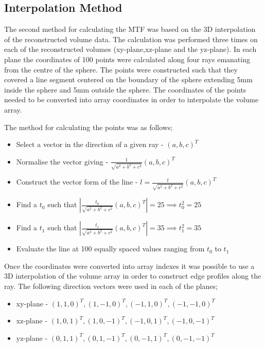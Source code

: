 \documentclass[
  twoside,
  11pt, a4paper,
  footinclude=true,
  headinclude=true,
  cleardoublepage=empty
]{scrbook}
\begin{document}
\subsection{Interpolation Method}

The second method for calculating the MTF was based on the 3D interpolation of the reconstructed volume data. The calculation was performed three times on each of the reconstructed volumes (xy-plane,xz-plane and the yz-plane). In each plane the coordinates of 100 points were calculated along four rays emanating from the centre of the sphere. The points were constructed such that they covered a line segment centered on the boundary of the sphere extending 5mm inside the sphere and 5mm outside the sphere. The coordinates of the points needed to be converted into array coordinates in order to interpolate the volume array.

The method for calculating the points was as follows;

\begin{itemize}
\item Select a vector in the direction of a given ray - $(a,b,c)^T$
\item Normalise the vector giving - $\frac{1}{\sqrt{a^2+b^2+c^2}}(a,b,c)^T$
\item Construct the vector form of the line - $l = \frac{t}{\sqrt{a^2+b^2+c^2}}(a,b,c)^T$
\item Find a $t_0$ such that $|\frac{t_0}{\sqrt{a^2+b^2+c^2}}(a,b,c)^T| = 25 \implies t_0^2 = 25$
\item Find a $t_1$ such that $|\frac{t_1}{\sqrt{a^2+b^2+c^2}}(a,b,c)^T| = 35 \implies t_1^2 = 35$
\item Evaluate the line at 100 equally spaced values ranging from $t_0$ to $t_1$
\end{itemize}

Once the coordinates were converted into array indexes it was possible to use a 3D interpolation of the volume array in order to construct edge profiles along the ray. The following direction vectors were used in each of the planes;

\begin{itemize}
\item xy-plane - ${(1,1,0)^T,(1,-1,0)^T,(-1,1,0)^T,(-1,-1,0)^T}$
\item xz-plane - ${(1,0,1)^T,(1,0,-1)^T,(-1,0,1)^T,(-1,0,-1)^T}$
\item yz-plane - ${(0,1,1)^T,(0,1,-1)^T,(0,-1,1)^T,(0,-1,-1)^T}$
\end{itemize}
\end{document}
